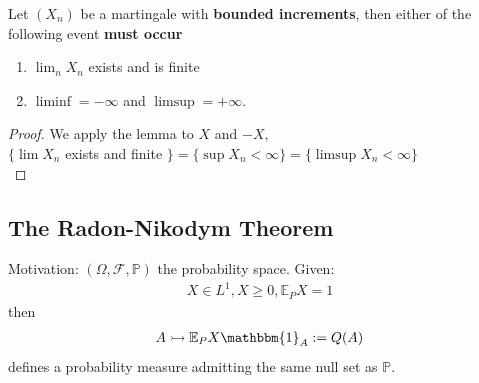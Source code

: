\begin{theorem}
Let $(X_n)$ be a martingale with \textbf{bounded increments}, then either of the following event \textbf{must occur}
\begin{enumerate}
	\item $\lim_{n} X_n$ exists and is finite
	\item $\liminf = -\infty$ and $\limsup = +\infty$.
\end{enumerate}	
\end{theorem}
\begin{proof}
	We apply the lemma to $X$ and $-X$,\\
 	$\{ \lim X_n$ exists and finite $\} = \{ \sup X_n < \infty\} = \{\limsup X_n < \infty\}$\\ 
\end{proof}


\subsection{The Radon-Nikodym Theorem}
Motivation: $(\Omega, \mathcal{F}, \mathbb{P})$ the probability space. Given:
\begin{align*}
	X \in L^1, X \geq 0, \mathbb{E}_PX = 1
\end{align*}
then 
\begin{align*}
	A \rightarrowtail \mathbb{E}_P X \mathbbm{1}_{A}:= Q(A)
\end{align*}
defines a probability measure admitting the same null set as $\mathbb{P}$.

\begin{definition}
\end{definition}

